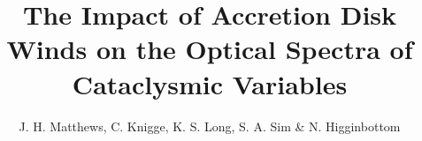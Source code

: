 \documentclass[preprint, a4paper, 11pt]{aastex}
\begin{document}

\renewcommand{\labelitemi}{$\bullet$}
\def\py{\textsc{Python}}
\def\tar{\textsc{Tardis} }
\def\cld{\textsc{Cloudy} }
\def\civ{C~\textsc{iv} }
\def\araa{ARAA}
\def\nat{Nature}
\def\apjl{ApJ Letters}
\def\aapr{AAPR}
\def\actaa{ACTAA} 
\def\ssr{SSR}
\def\apj{ApJ}
\def\apss{AP\&SS}
\def\pasp{PASP}
\def\aap{A\&A}
\def\mnras{MNRAS}
\def\aj{AJ}
\def\rmxaa{RMXAA}

\def\heiiopt{He~\textsc{ii}~$\lambda4686$}
\def\heiiuv{He~\textsc{ii}~$\lambda1640$}
\def\heiioptnew{He~\textsc{ii}~$\lambda3202$}
\def\la{Ly$\alpha$}
\def\ha{H$\alpha$}
\def\hb{H$\beta$}
\def\civfull{C~\textsc{iv}~$\lambda1550$}

%
%


\title{The Impact of Accretion Disk Winds on the Optical Spectra of Cataclysmic Variables}
\author{J. H. Matthews, C. Knigge, K. S. Long, S. A. Sim \& N. Higginbottom}


%
%
\end{document}
